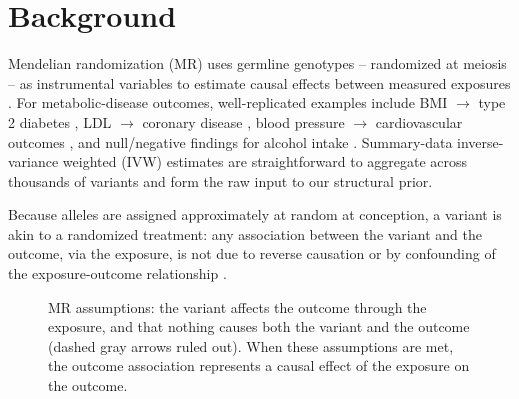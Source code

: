 \documentclass[11pt]{article}
\begin{document}
\section{Background}

Mendelian randomization (MR) uses germline genotypes -- randomized at meiosis -- as instrumental variables to estimate causal effects between measured exposures \citep{DaveySmith2014, Corbin2016}. For metabolic-disease outcomes, well-replicated examples include BMI $\to$ type 2 diabetes \citep{Fall2015, Xue2018}, LDL $\to$ coronary disease \citep{Ference2017, Emdin2017}, blood pressure $\to$ cardiovascular outcomes \citep{Nazarzadeh2022}, and null/negative findings for alcohol intake \citep{Holmes2014}. Summary-data inverse-variance weighted (IVW) estimates are straightforward to aggregate across thousands of variants and form the raw input to our structural prior.

Because alleles are assigned approximately at random at conception, a variant is akin to a randomized treatment: any association between the variant and the outcome, via the exposure, is not due to reverse causation or by confounding of the exposure-outcome relationship \citep{DaveySmith2014}.

\begin{figure}[h]
\centering
{}
\caption{MR assumptions: the variant affects the outcome through the exposure, and that nothing causes both the variant and the outcome (dashed gray arrows ruled out). When these assumptions are met, the outcome association represents a causal effect of the exposure on the outcome.}
\label{fig:mr-dag}
\end{figure}
\end{document}
